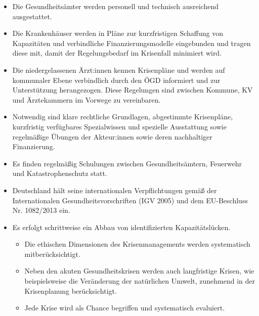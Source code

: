 \documentclass{article}
\begin{document}
\begin{itemize}
\item Die Gesundheitsämter werden personell und technisch ausreichend ausgestattet.


\item Die Krankenhäuser werden in Pläne zur kurzfristigen Schaffung von Kapazitäten und verbindliche Finanzierungsmodelle eingebunden und tragen diese mit, damit der Regelungsbedarf im Krisenfall minimiert wird.


\item Die niedergelassenen Ärzt:innen kennen Krisenpläne und werden auf kommunaler Ebene verbindlich durch den ÖGD informiert und zur Unterstützung herangezogen. Diese Regelungen sind zwischen Kommune, KV und Ärztekammern im Vorwege zu vereinbaren.


\item Notwendig sind klare rechtliche Grundlagen, abgestimmte Krisenpläne, kurzfristig verfügbares Spezialwissen und spezielle Ausstattung sowie regelmäßige Übungen der Akteur:innen sowie deren nachhaltiger Finanzierung.


\item Es finden regelmäßig Schulungen zwischen Gesundheitsämtern, Feuerwehr und Katastrophenschutz statt.


\item Deutschland hält seine internationalen Verpflichtungen gemäß der Internationalen Gesundheitsvorschriften (IGV 2005) und dem EU-Beschluss Nr. 1082/2013 ein.


\item Es erfolgt schrittweise ein Abbau von identifizierten Kapazitätslücken.

\begin{itemize}
\item Die ethischen Dimensionen des Krisenmanagements werden systematisch mitberücksichtigt.


\end{itemize}
\begin{itemize}
\item Neben den akuten Gesundheitskrisen werden auch langfristige Krisen, wie beispielsweise die Veränderung der natürlichen Umwelt, zunehmend in der Krisenplanung berücksichtigt.


\end{itemize}
\begin{itemize}
\item Jede Krise wird als Chance begriffen und systematisch evaluiert. 


\end{itemize}

\end{itemize}
\end{document}
